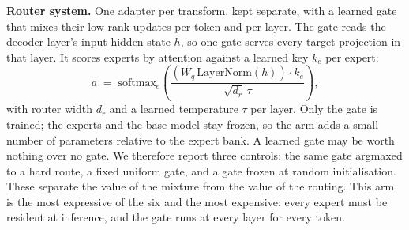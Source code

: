 \noindent\textbf{Router system.} One adapter per transform, kept separate, with a learned gate that
mixes their low-rank updates per token and per layer. The gate reads the decoder layer's input hidden state $h$, so one gate serves every target
projection in that layer. It scores experts by attention against a learned key $k_e$ per expert:
%
\begin{equation}
a \;=\; \mathrm{softmax}_e\!\left( \frac{ \left(W_q\,\mathrm{LayerNorm}(h)\right) \cdot k_e }{ \sqrt{d_r}\,\tau } \right),
\label{eq:gate}
\end{equation}
%
with router width $d_r$ and a learned temperature $\tau$ per layer. Only the gate is trained; the
experts and the base model stay frozen, so the arm adds a small number of parameters relative to the
expert bank. A learned gate may be worth nothing over no gate. We therefore report three controls: the same gate
argmaxed to a hard route, a fixed uniform gate, and a gate frozen at random initialisation. These
separate the value of the mixture from the value of the routing. This arm is the most expressive of the six and the most expensive: every
expert must be resident at inference, and the gate runs at every layer for every token.
